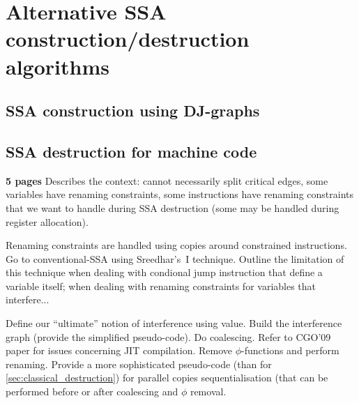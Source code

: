 \chapter{Alternative SSA construction/destruction algorithms }

\section{SSA construction using DJ-graphs }

\section{SSA destruction for machine code }
\label{sec:advanced_destruction}
\textbf{5 pages}
Describes the context: cannot necessarily split critical edges, some variables have renaming constraints, some instructions have renaming constraints that we want to handle during SSA destruction (some may be handled during register allocation). 

Renaming constraints are handled using copies around constrained instructions. Go to conventional-SSA using Sreedhar's~I technique. Outline the limitation of this technique when dealing with condional jump instruction that define a variable itself; when dealing with renaming constraints for variables that interfere...

Define our ``ultimate'' notion of interference using value. Build the interference graph (provide the simplified pseudo-code). Do coalescing. Refer to CGO'09 paper for issues concerning JIT compilation. Remove $\phi$-functions and perform renaming. Provide a more sophisticated pseudo-code (than for \ref{sec:classical_destruction}) for parallel copies sequentialisation (that can be performed before or after coalescing and $\phi$ removal.

